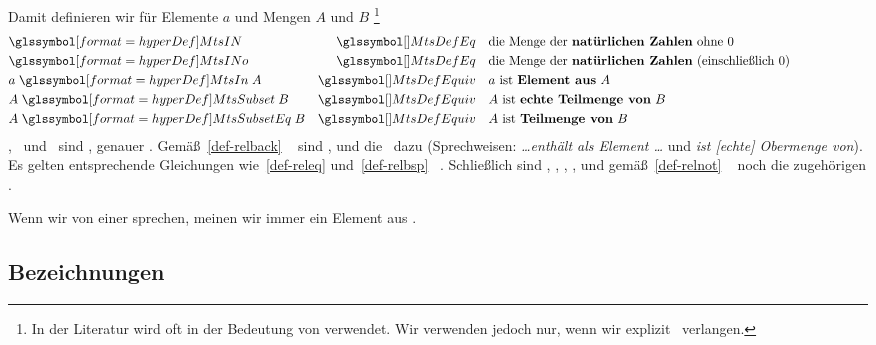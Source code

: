 Damit definieren wir für Elemente $a$ und Mengen $A$ und $B$%
\footnote{%
	In der Literatur wird \chrqt{\MtsSubset} oft in der Bedeutung von \chrqt{\MtsSubsetEq} verwendet.
	Wir verwenden \chrqt{\MtsSubset} jedoch nur, wenn wir explizit \Ungleichheit\ verlangen.
}
\begin{align}
	&   \defSym{\MtsIN}           & \MtsDefEq    \quad &
	\text{die Menge der \defFt{natürlichen Zahlen}  ohne           $0$}
	\label{def-MtsIN}   \\
	&   \defSym{\MtsINo}          & \MtsDefEq    \quad &
	\text{die Menge der \defFt{natürlichen Zahlen} (einschließlich $0$)}
	\label{def-MtsINo}  \\
	& a \defSymBin{\MtsIn}       A & \MtsDefEquiv \quad &
	\text{$a$ ist         \defFt{Element aus} $A$}
	\label{def-MtsIn} \\
	& A \defSymBin{\MtsSubset}   B & \MtsDefEquiv \quad &
	\text{$A$ ist \defFt{echte Teilmenge von} $B$}
	\label{def-MtsSub}   \\
	& A \defSymBin{\MtsSubsetEq} B & \MtsDefEquiv \quad &
	\text{$A$ ist  \defFt     {Teilmenge von} $B$}
	\label{def-MtsSubeq} \formulatoleft
\end{align}
\MtsIn, \MtsSubset\ und \MtsSubsetEq\ sind \Relationen, genauer .
Gemäß~\eqref{def-relback} \pagename~\pageref{def-relback} sind ,  und  die \Umkehrrelationen\ dazu (Sprechweisen: \emph{\dots enthält als Element \dots} und \emph{ist [echte] Obermenge von}).
Es gelten entsprechende Gleichungen wie~\eqref{def-releq} und~\eqref{def-relbsp} \pagename~\pageref{def-releq}.
Schließlich sind , , , ,  und  gemäß~\eqref{def-relnot} \pagename~\pageref{def-relnot} noch die zugehörigen \Negationen.

Wenn wir von einer  sprechen, meinen wir immer ein Element aus \MtsINo.

\subsection{Bezeichnungen}%
\label {sub-Bezeichnungen}

